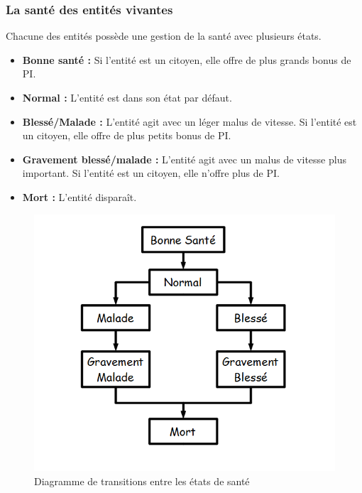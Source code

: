 \documentclass[a4paper]{memoir}
\begin{document}
				\subsubsection{La santé des entités vivantes}
					Chacune des entités possède une gestion de la santé avec plusieurs états.
					\begin{itemize}[label=$\bullet$]
						\item \textbf{Bonne santé :} Si l'entité est un citoyen, elle offre de plus grands bonus de PI.
						\item \textbf{Normal :} L'entité est dans son état par défaut.
						\item \textbf{Blessé/Malade :} L'entité agit avec un léger malus de vitesse. Si l'entité est un citoyen, elle offre de plus petits bonus de PI.
						\item \textbf{Gravement blessé/malade :} L'entité agit avec un malus de vitesse plus important. Si l'entité est un citoyen, elle n'offre plus de PI.
						\item \textbf{Mort :} L'entité disparaît.
					\end{itemize}
					\begin{figure}[H]
						\begin{center}
							\includegraphics[scale=0.5]{img/DiagrammeTransitionSante.png} 
						\end{center}
						\label{fig:sante}
						\caption{Diagramme de transitions entre les états de santé}
					\end{figure}
	
\end{document}
